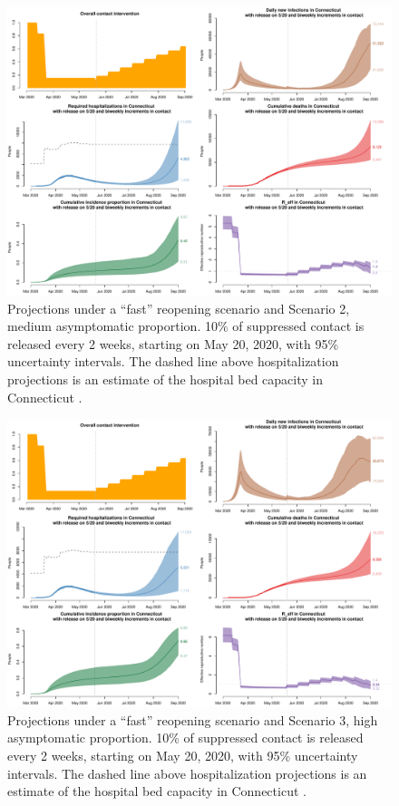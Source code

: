 \documentclass[11pt]{article}
\begin{document}
\begin{figure} %
	\centering
	\includegraphics[width=.9\textwidth]{figures/fast_medium_full.pdf}
	\caption{Projections under a ``fast'' reopening scenario and Scenario 2, medium asymptomatic proportion. 10\% of suppressed contact is released every 2 weeks, starting on May 20, 2020, with 95\% uncertainty intervals. The dashed line above hospitalization projections is an estimate of the hospital bed capacity in Connecticut \citep{CHAwebsite}. }
	\label{fig:fast_medium}
\end{figure}

\begin{figure} %
	\centering
	\includegraphics[width=.9\textwidth]{figures/fast_high_full.pdf}
	\caption{Projections under a ``fast'' reopening scenario and Scenario 3, high asymptomatic proportion. 10\% of suppressed contact is released every 2 weeks, starting on May 20, 2020, with 95\% uncertainty intervals. The dashed line above hospitalization projections is an estimate of the hospital bed capacity in Connecticut \citep{CHAwebsite}. }
	\label{fig:fast_high}
\end{figure}
\end{document}
